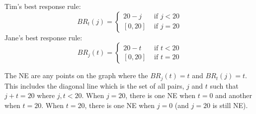 \documentclass[addpoints ]{exam}
\begin{document}
\begin{questions}
\begin{solution}
  Tim's best response rule:
  $$ 
  BR_t(j) = \begin{cases}
    20 - j & \text{ if } j < 20 \\
    [0,20] & \text{ if } j = 20
    \end{cases}
  $$
  Jane's best response rule:
  $$ 
  BR_j(t) = \begin{cases}
    20 - t & \text{ if } t < 20 \\
    [0,20] & \text{ if } t = 20
    \end{cases}
  $$


  The NE are any points on the graph where the $BR_j(t) = t$ and $BR_t(j) = t$.
  This includes the diagonal line which is the set of all pairs,
  $j$ and $t$ such that $j + t = 20$ where $j,t<20$.
  When $j=20$, there is one NE when $t=0$ and another when $t=20$.
  When $t=20$, there is one NE when $j=0$ (and $j=20$ is still NE).

\end{solution}

\newpage





\end{questions}
\end{document}
